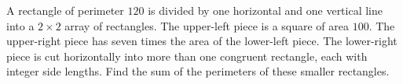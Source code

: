A rectangle of perimeter $120$ is divided by one horizontal and one vertical line into a $2\times2$ array of rectangles. The upper-left piece is a square of area $100$. The upper-right piece has seven times the area of the lower-left piece. The lower-right piece is cut horizontally into more than one congruent rectangle, each with integer side lengths. Find the sum of the perimeters of these smaller rectangles.
